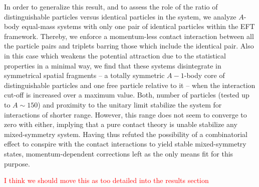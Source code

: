 \documentclass[preprint,12pt]{elsarticle}
\newcommand{\lc}{\ensuremath{\Lambda_c}}
\newcommand{\red}[1]{\textcolor{red}{#1}}
\newcommand{\ie}{\textit{i.e.}~}
\begin{document}
In order to generalize this result, and to assess the role of the ratio of distinguishable particles versus identical
particles in the system, we analyze $A$-body equal-mass systems with only one pair of identical particles within the EFT framework.
Thereby, we enforce a momentum-less contact interaction between all the particle pairs and triplets barring those which include the
identical pair. 
Also in this case which weakens the potential attraction due to the statistical properties in a minimal way, we find that these systems 
disintegrate in symmetrical spatial fragments -- a totally symmetric $A-1$-body core of distinguishable particles and one free particle
relative to it -- when the interaction cut-off is increased over a maximum value.
Both, number of particles (tested up to $A\sim150$) and proximity to the unitary limit stabilize the system for interactions of shorter range.
However, this range does not seem to converge to zero with either, implying that a pure contact theory is unable stabilize any mixed-symmetry
system. Having thus refuted the possibility of a combinatorial effect to conspire with the contact interactions to yield stable
mixed-symmetry states, momentum-dependent corrections left as the only means fit for this purpose.

\red{I think we should move this as too detailed into the results section}
\end{document}

